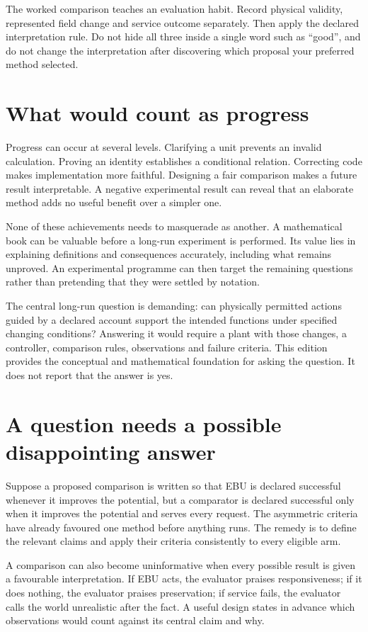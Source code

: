 The worked comparison teaches an evaluation habit. Record physical validity, represented field change and service outcome separately. Then apply the declared interpretation rule. Do not hide all three inside a single word such as ``good'', and do not change the interpretation after discovering which proposal your preferred method selected.

\section{What would count as progress}
Progress can occur at several levels. Clarifying a unit prevents an invalid calculation. Proving an identity establishes a conditional relation. Correcting code makes implementation more faithful. Designing a fair comparison makes a future result interpretable. A negative experimental result can reveal that an elaborate method adds no useful benefit over a simpler one.

None of these achievements needs to masquerade as another. A mathematical book can be valuable before a long-run experiment is performed. Its value lies in explaining definitions and consequences accurately, including what remains unproved. An experimental programme can then target the remaining questions rather than pretending that they were settled by notation.

The central long-run question is demanding: can physically permitted actions guided by a declared account support the intended functions under specified changing conditions? Answering it would require a plant with those changes, a controller, comparison rules, observations and failure criteria. This edition provides the conceptual and mathematical foundation for asking the question. It does not report that the answer is yes.

\section{A question needs a possible disappointing answer}
Suppose a proposed comparison is written so that EBU is declared successful whenever it improves the potential, but a comparator is declared successful only when it improves the potential and serves every request. The asymmetric criteria have already favoured one method before anything runs. The remedy is to define the relevant claims and apply their criteria consistently to every eligible arm.

A comparison can also become uninformative when every possible result is given a favourable interpretation. If EBU acts, the evaluator praises responsiveness; if it does nothing, the evaluator praises preservation; if service fails, the evaluator calls the world unrealistic after the fact. A useful design states in advance which observations would count against its central claim and why.

